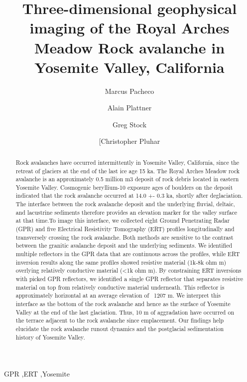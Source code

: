 \documentclass[5p]{elsarticle}
\begin{document}
	\begin{frontmatter}

\title{Three-dimensional geophysical imaging of the Royal Arches Meadow Rock avalanche in Yosemite Valley, California}

\author[Marcus]{Marcus Pacheco}
\address[Marcus]{California State University, Fresno}

\author[Alain]{Alain Plattner}
\address[Alain]{University of Alabama}

\author[Greg]{Greg Stock}
\address[Greg]{Yosemite National Park}

\author[Chris]{[Christopher Pluhar}
\address[Chris]{California State University, Fresno}



										\begin{abstract}
										

Rock avalanches have occurred intermittently in Yosemite Valley, California, since the retreat of glaciers at the end of the last ice age \~15 ka. The Royal Arches Meadow rock avalanche is an approximately 0.5 million m3 deposit of rock debris located in eastern Yosemite Valley. Cosmogenic beryllium-10 exposure ages of boulders on the deposit indicated that the rock avalanche occurred at 14.0 +- 0.3 ka, shortly after deglaciation. The interface between the rock avalanche deposit and the underlying fluvial, deltaic, and lacustrine sediments therefore provides an elevation marker for the valley surface at that time.To image this interface, we collected eight Ground Penetrating Radar (GPR) and five Electrical Resistivity Tomography (ERT) profiles longitudinally and transversely crossing the rock avalanche. Both methods are sensitive to the contrast between the granitic avalanche deposit and the underlying sediments. We identified multiple reflectors in the GPR data that are continuous across the profiles, while ERT inversion results along the same profiles showed resistive material (1k-8k ohm m) overlying relatively conductive material (<1k ohm m). By constraining ERT inversions with picked GPR reflectors, we identified a single GPR reflector that separates resistive material on top from relatively conductive material underneath. This reflector is approximately horizontal at an average elevation of ~1207 m. We interpret this interface as the bottom of the rock avalanche and hence as the surface of Yosemite Valley at the end of the last glaciation. Thus, 10 m of aggradation have occurred on the terrace adjacent to the rock avalanche since emplacement. Our findings help elucidate the rock avalanche runout dynamics and the postglacial sedimentation history of Yosemite Valley.

									\end{abstract}

					\begin{keyword}
GPR \sep ERT \sep Yosemite
					\end{keyword}

	\end{frontmatter}
\end{document}
